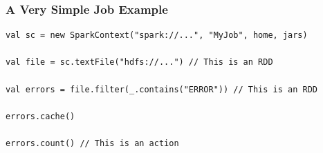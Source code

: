 

\begin{frame}[fragile]
\frametitle{A Very Simple Job Example}


\begin{lstlisting}
val sc = new SparkContext("spark://...", "MyJob", home, jars) 

val file = sc.textFile("hdfs://...") // This is an RDD

val errors = file.filter(_.contains("ERROR")) // This is an RDD

errors.cache()

errors.count() // This is an action
\end{lstlisting}

\end{frame}


